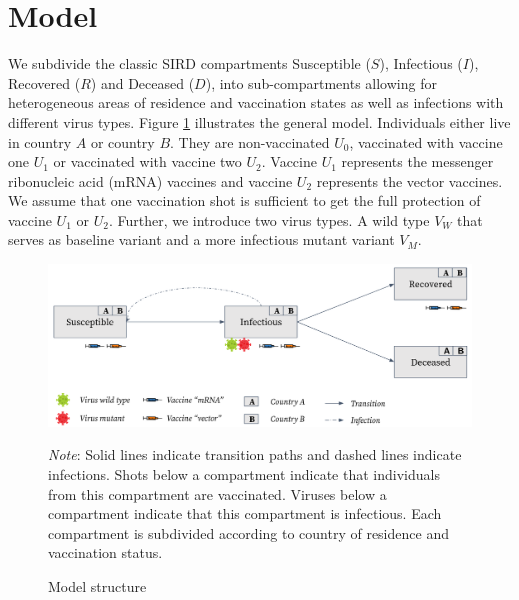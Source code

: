 \section{Model}
\label{sec:model}
We subdivide the classic SIRD compartments Susceptible ($S$), Infectious ($I$), Recovered ($R$) and Deceased ($D$), into sub-compartments allowing for heterogeneous areas of residence and vaccination states as well as infections with different virus types. Figure \ref{fig:model} illustrates the general model. Individuals either live in country $A$ or country $B$. They are non-vaccinated $U_0$, vaccinated with vaccine one $U_1$ or vaccinated with vaccine two $U_2$. Vaccine $U_1$ represents the messenger ribonucleic acid (mRNA) vaccines and vaccine $U_2$ represents the vector vaccines. We assume that one vaccination shot is sufficient to get the full protection of vaccine $U_1$ or $U_2$. Further, we introduce two virus types. A wild type $V_W$ that serves as baseline variant and a more infectious mutant variant $V_M$.\\
\begin{figure}[h!]
\centering
\includegraphics[scale=0.3]{images/vaccination_pp_blue_orange.png}\\
\begin{flushleft}
\scriptsize{\textit{Note}: Solid lines indicate transition paths and dashed lines indicate infections. Shots below a compartment indicate that individuals from this compartment are vaccinated. Viruses below a compartment indicate that this compartment is infectious. Each compartment is subdivided according to country of residence and vaccination status.}
\end{flushleft}
\caption{Model structure}
\label{fig:model}
\end{figure}

